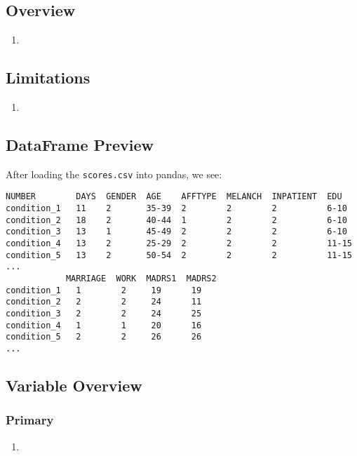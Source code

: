 \documentclass[12pt]{article}
\begin{document}
\subsection{Overview}

\begin{enumerate}[itemsep=0em,label={(\alph*)}]
\item{}
\end{enumerate}

\subsection{Limitations}

\begin{enumerate}[itemsep=0em,label={(\alph*)}]
\item{}
\end{enumerate}

\subsection{DataFrame Preview}

\noindent After loading the {\tt scores.csv} into pandas, we see:

\begin{verbatim}
NUMBER        DAYS  GENDER  AGE    AFFTYPE  MELANCH  INPATIENT  EDU    
condition_1   11    2       35-39  2        2        2          6-10   
condition_2   18    2       40-44  1        2        2          6-10   
condition_3   13    1       45-49  2        2        2          6-10   
condition_4   13    2       25-29  2        2        2          11-15  
condition_5   13    2       50-54  2        2        2          11-15  
...
        	MARRIAGE  WORK  MADRS1  MADRS2
condition_1   1        2     19      19
condition_2   2        2     24      11
condition_3   2        2     24      25
condition_4   1        1     20      16
condition_5   2        2     26      26
...
\end{verbatim}

\subsection{Variable Overview}

\subsubsection{Primary}

\begin{enumerate}[itemsep=0em,label={\roman*.}]
\item{}
\end{enumerate}
\end{document}

